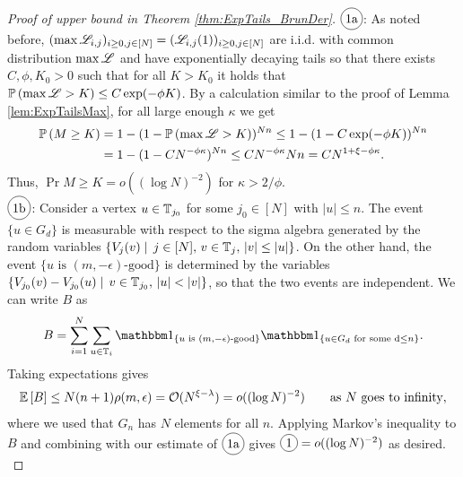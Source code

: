 \begin{proof}[Proof of upper bound in Theorem \ref{thm:ExpTails_BrunDer}]
$\circled{1a}$: As noted before, $(\max \mathscr{L}_{i,j})_{i \geq 0, j \in [N]} = (\mathscr{L}_{i, j}(1))_{i \geq 0, j \in [N]}$ are i.i.d. with common distribution $\max \mathscr{L}$ and have exponentially decaying tails so that there exists $C, \phi, K_0 > 0$ such that for all $K > K_0$ it holds that $\mathbb{P} \left( \max \mathscr{L} > K \right) \leq C \exp(-\phi K)$. By a calculation similar to the proof of Lemma \ref{lem:ExpTailsMax}, for all large enough $\kappa$ we get
\begin{align}
\mathbb{P} \left( M \geq K \right) &= 1 - (1 - \mathbb{P} \left( \max \mathscr{L} > K \right))^{Nn} \leq 1 - (1 - C \exp(-\phi K))^{Nn} \\
			  &= 1 - (1 - C N^{-\phi \kappa})^{Nn} \leq C N^{-\phi \kappa} Nn = C N^{1 + \xi - \phi \kappa}. 	
\end{align} 
Thus, $\Pr{M \geq K} = o((\log N)^{-2})$ for $\kappa > 2/\phi$. \\

$\circled{1b}$: Consider a vertex $u \in \mathbb{T}_{j_0}$ for some $j_0 \in [N]$ with $|u| \leq n$. The event $\{u \in G_d\}$ is measurable with respect to the sigma algebra generated by the random variables $\{ V_j(v) \mid\, j \in [N],\, v \in \mathbb{T}_j,\, |v| \leq |u|\}$. On the other hand, the event $\{ u \text{ is }(m, - \epsilon) \text{-good}\}$ is determined by the variables $\{ V_{j_0}(v) - V_{j_0}(u) \mid\, v \in \mathbb{T}_{j_0},\, |u| < |v| \}$, so that the two events are independent. We can write $B$ as 
\begin{equation}\nonumber
B = \sum\limits_{i=1}^N \sum\limits_{u \in \bb{T}_i} \Ind_{\{u \text{ is } (m, - \epsilon)\text{-good}\}} \Ind_{\{u \in G_d \text{ for some d} \leq n \}}. 
\end{equation}
Taking expectations gives 
\begin{equation}\nonumber
\mathbb{E}\left[ B \right] \leq N(n+1)\rho(m, \epsilon) = \mathcal{O}(N^{\xi -\lambda}) = o((\log N)^{-2}) \qquad\text{as $N$ goes to infinity}, 
\end{equation}
where we used that $G_n$ has $N$ elements for all $n$. Applying Markov's inequality to $B$ and combining with our estimate of $\circled{1a}$ gives $\circled{1} = o((\log N)^{-2})$ as desired. \\


\end{proof}
